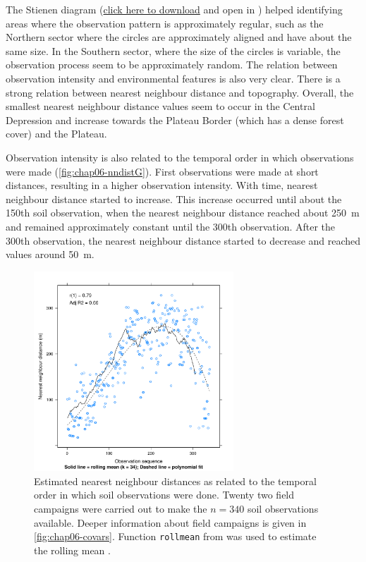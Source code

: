 The Stienen diagram (\href{https://drive.google.com/file/d/0B7xsLbrOA23oeG9zSWVLcnZYdEk/edit?usp=sharing}{click
here to download} and open in \googleearth) helped identifying areas where the observation pattern is 
approximately regular, such as the Northern sector where the circles are approximately aligned and have about 
the same size. In the Southern sector, where the size of the circles is variable, the observation process seem 
to be approximately random. The relation between observation intensity and environmental features is also very 
clear. There is a strong relation between nearest neighbour distance and topography. Overall, the smallest 
nearest neighbour distance values seem to occur in the Central Depression and increase towards the Plateau 
Border (which has a dense forest cover) and the Plateau.

Observation intensity is also related to the temporal order in which observations were made 
(\autoref{fig:chap06-nndistG}). First observations were made at short distances, resulting in a higher 
observation intensity. With time, nearest neighbour distance started to increase. This increase occurred until 
about the \num{150}th soil observation, when the nearest neighbour distance reached about \SI{250}{\m} and 
remained approximately constant until the \num{300}th observation. After the \num{300}th observation, the 
nearest neighbour distance started to decrease and reached values around \SI{50}{\m}.

\begin{figure}[!ht]
 \centering
 \includegraphics[trim=0mm 0mm 0mm 12mm,clip=true,width=7.5cm]{fig/chap06-nndistG.pdf}
 \caption{Estimated nearest neighbour distances as related to the temporal order in which soil observations 
 were done. Twenty two field campaigns were carried out to make the $n = 340$ soil observations available.
 Deeper information about field campaigns is given in \autoref{fig:chap06-covars}. Function \texttt{rollmean} 
 from  was used to estimate the rolling mean \cite{ZeileisEtAl2005}.}
 \label{fig:chap06-nndistG}
\end{figure}

